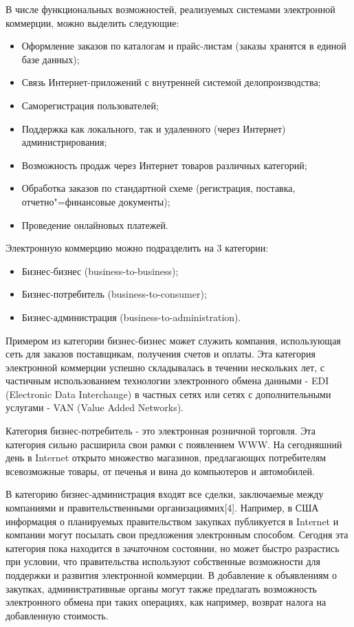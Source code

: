 В числе функциональных возможностей, реализуемых системами электронной коммерции, можно выделить следующие:
\begin{itemize}
  \item Оформление заказов по каталогам и прайс-листам (заказы хранятся в единой базе данных);
  \item Связь Интернет-приложений с внутренней системой делопроизводства;
  \item Саморегистрация пользователей;
  \item Поддержка как локального, так и удаленного (через Интернет) администрирования;
  \item Возможность продаж через Интернет товаров различных категорий;
  \item Обработка заказов по стандартной схеме (регистрация, поставка, отчетно"=финансовые документы);
  \item Проведение онлайновых платежей.
\end{itemize}

Электронную коммерцию можно подразделить на 3 категории:
\begin{itemize}
  \item Бизнес-бизнес (business-to-business);
  \item Бизнес-потребитель (business-to-consumer);
  \item Бизнес-администрация (business-to-administration).
\end{itemize}

Примером из категории бизнес-бизнес может служить компания, использующая сеть для заказов поставщикам, получения счетов и оплаты.
Эта категория электронной коммерции успешно складывалась в течении нескольких лет, с частичным использованием технологии электронного обмена данными - EDI (Electronic Data Interchange) в частных сетях или сетях с дополнительными услугами - VAN (Value Added Networks).

Категория бизнес-потребитель - это электронная розничной торговля. Эта категория сильно расширила свои рамки с появлением WWW.
На сегодняшний день в Internet открыто множество магазинов, предлагающих потребителям всевозможные товары, от печенья и вина до компьютеров и автомобилей.

В категорию бизнес-администрация входят все сделки, заключаемые между компаниями и правительственными организациямих[4].
Например, в США информация о планируемых правительством закупках публикуется в Internet и компании могут посылать свои предложения электронным способом.
Сегодня эта категория пока находится в зачаточном состоянии, но может быстро разрастись при условии, что правительства используют собственные возможности для поддержки и развития электронной коммерции.
В добавление к объявлениям о закупках, административные органы могут также предлагать возможность электронного обмена при таких операциях, как например, возврат налога на добавленную стоимость.

